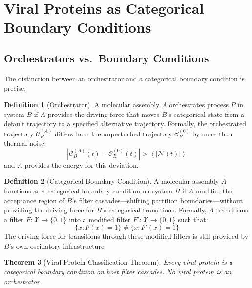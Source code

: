 \documentclass[12pt,a4paper]{article}
\newtheorem{theorem}{Theorem}[section]
\theoremstyle{definition}
\newtheorem{definition}[theorem]{Definition}
\theoremstyle{remark}
\newcommand{\abs}[1]{\left|#1\right|}
\newcommand{\avg}[1]{\left\langle #1 \right\rangle}
\begin{document}
\section{Viral Proteins as Categorical Boundary Conditions}
\label{sec:boundary}

\subsection{Orchestrators vs.\ Boundary Conditions}

The distinction between an orchestrator and a categorical boundary condition is precise:

\begin{definition}[Orchestrator]
\label{def:orchestrator}
A molecular assembly $A$ orchestrates process $P$ in system $B$ if $A$ provides the driving force that moves $B$'s categorical state from a default trajectory to a specified alternative trajectory. Formally, the orchestrated trajectory $\mathcal{C}_B^{(A)}$ differs from the unperturbed trajectory $\mathcal{C}_B^{(0)}$ by more than thermal noise:
\begin{equation}
  \abs{\mathcal{C}_B^{(A)}(t) - \mathcal{C}_B^{(0)}(t)} > \avg{\abs{\mathcal{N}(t)}}
\end{equation}
and $A$ provides the energy for this deviation.
\end{definition}

\begin{definition}[Categorical Boundary Condition]
\label{def:BC}
A molecular assembly $A$ functions as a categorical boundary condition on system $B$ if $A$ modifies the acceptance region of $B$'s filter cascades---shifting partition boundaries---without providing the driving force for $B$'s categorical transitions. Formally, $A$ transforms a filter $F: \mathcal{X} \to \{0, 1\}$ into a modified filter $F': \mathcal{X} \to \{0, 1\}$ such that:
\begin{equation}
  \{x : F(x) = 1\} \neq \{x : F'(x) = 1\}
\end{equation}
The driving force for transitions through these modified filters is still provided by $B$'s own oscillatory infrastructure.
\end{definition}

\begin{theorem}[Viral Protein Classification Theorem]
\label{thm:viral_protein_class}
Every viral protein is a categorical boundary condition on host filter cascades. No viral protein is an orchestrator.
\end{theorem}
\end{document}
